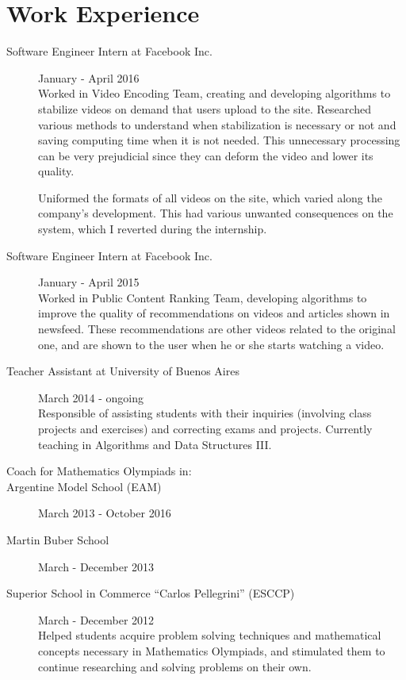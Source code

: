 \documentclass [a4paper, 11pt]{article}
\newcommand{\tabu}{\hspace*{0.7cm}}
\begin{document}
\newpage
\section* {Work Experience}

\begin{description}
  \item[Software Engineer Intern at Facebook Inc.] {\hfill January - April 2016\\
Worked in Video Encoding Team, creating and developing algorithms to stabilize videos on demand that users upload to the site. Researched various methods to understand when stabilization is necessary or not and saving computing time when it is not needed. This unnecessary processing can be very prejudicial since they can deform the video and lower its quality.

Uniformed the formats of all videos on the site, which varied along the company's development. This had various unwanted consequences on
the system, which I reverted during the internship.
}

  \item[Software Engineer Intern at Facebook Inc.] {\hfill January - April 2015\\
Worked in Public Content Ranking Team, developing algorithms to improve the quality of recommendations on videos and articles shown in newsfeed. These recommendations are other videos related to the original one, and are shown to the user when he or she starts watching a video.
}

  \item[Teacher Assistant at University of Buenos Aires] {\hfill March 2014 - ongoing\\
  Responsible of assisting students with their inquiries (involving class projects and 
  exercises) and correcting exams and projects. Currently teaching in Algorithms 
  and Data Structures III.\\
}

\item[Coach for Mathematics Olympiads in:]
\item[\tabu Argentine Model School (EAM)] {\hfill March 2013 - October 2016}
\item[\tabu Martin Buber School] {\hfill March - December 2013}
\item[\tabu Superior School in Commerce ``Carlos Pellegrini'' (ESCCP)] { \hfill March - December 2012 \\

Helped students acquire problem solving techniques and mathematical concepts necessary in Mathematics Olympiads, and stimulated them to continue researching and solving problems on their own.
	}

\end{description}
\end{document}
